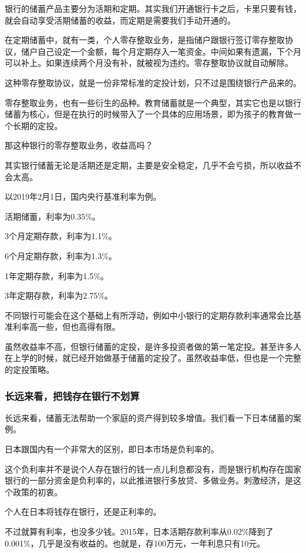 银行的储蓄产品主要分为活期和定期。其实我们开通银行卡之后，卡里只要有钱，就会自动享受活期储蓄的收益，而定期是需要我们手动开通的。

在定期储蓄中，就有一类，个人零存整取业务，是指储户跟银行签订零存整取协议，储户自己设定一个金额，每个月定期存入一笔资金。中间如果有遗漏，下个月可以补上。如果连续两个月没有补，就被视为违约。零存整取协议就自动解除。

这种零存整取协议，就是一份非常标准的定投计划，只不过是围绕银行产品来的。

零存整取业务，也有一些衍生的品种。教育储蓄就是一个典型，其实它也是以银行储蓄为核心，但是在执行的时候带入了一个具体的应用场景，即为孩子的教育做一个长期的定投。

那这种银行的零存整取业务，收益高吗？

其实银行储蓄无论是活期还是定期，主要是安全稳定，几乎不会亏损，所以收益不会太高。

以2019年2月1日，国内央行基准利率为例。

{\kaishu 活期储蓄，利率为0.35\%。}

{\kaishu 3个月定期存款，利率为1.1\%。}

{\kaishu 6个月定期存款，利率为1.3\%。}

{\kaishu 1年定期存款，利率为1.5\%。}

{\kaishu 3年定期存款，利率为2.75\%。}

不同银行可能会在这个基础上有所浮动，例如中小银行的定期存款利率通常会比基准利率高一些，但也高得有限。

虽然收益率不高，但银行储蓄的定投，是许多投资者做的第一笔定投。甚至许多人在上学的时候，就已经开始做基于储蓄的定投了。虽然收益率低，但也是一个完整的定投策略。

\subsubsection{长远来看，把钱存在银行不划算}

长远来看，储蓄无法帮助一个家庭的资产得到较多增值。我们看一下日本储蓄的案例。

日本跟国内有一个非常大的区别，即日本市场是负利率的。

这个负利率并不是说个人存在银行的钱一点儿利息都没有，而是银行机构存在国家银行的一部分资金是负利率的，以此推进银行多放贷、多做业务。刺激经济，是这个政策的初衷。

个人在日本将钱存在银行，还是正利率的。

不过就算有利率，也没多少钱。2015年，日本活期存款利率从0.02\%降到了0.001\%，几乎是没有收益的。也就是，存100万元，一年利息只有10元。

